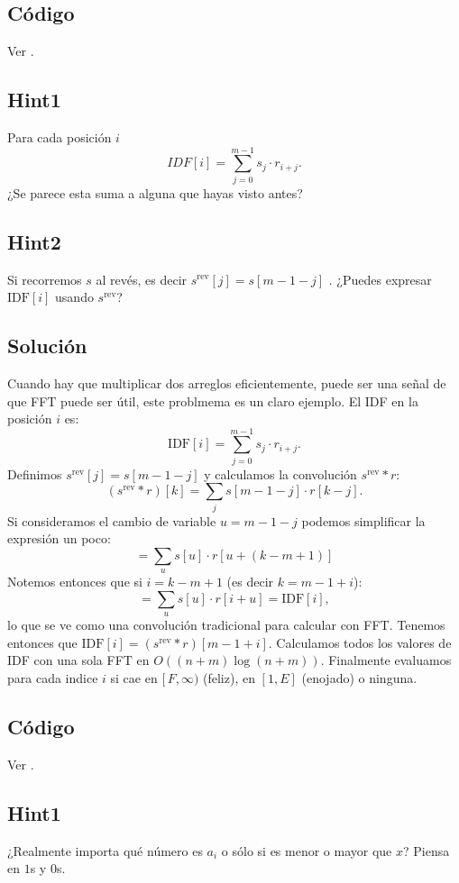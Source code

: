 \subsection*{Código}
Ver .

\subsection*{Hint1}
Para cada posición $i$
\[IDF[i]=\sum_{j=0}^{m-1} s_j \cdot r_{i+j}.\]
¿Se parece esta suma a alguna que hayas visto antes?
\subsection*{Hint2}
Si recorremos $s$ al revés, es decir $s^{\text{rev}}[j] = s[m-1-j]$ . ¿Puedes
expresar $\text{IDF}[i]$ usando $s^{\text{rev}}$?
\subsection*{Solución}
Cuando hay que multiplicar dos arreglos eficientemente, puede ser una señal de que FFT puede ser útil, este problmema es un claro ejemplo.
El IDF en la posición $i$ es:
\[
\text{IDF}[i] = \sum_{j=0}^{m-1} s_j \cdot r_{i+j}.
\]
Definimos $s^{\text{rev}}[j] = s[m-1-j]$ y calculamos la convolución
$s^{\text{rev}} * r$:
\[
(s^{\text{rev}} * r)[k] = \sum_j s[m-1-j] \cdot r[k-j].
\]
Si consideramos el cambio de variable $u = m-1-j$ podemos simplificar la expresión un poco:
\[
= \sum_u s[u] \cdot r[u+(k-m+1)]
\]
Notemos entonces que si $i = k-m+1$ (es decir $k = m-1+i$):
\[
= \sum_u s[u] \cdot r[i+u] = \text{IDF}[i],
\]
lo que se ve como una convolución tradicional para calcular con FFT. Tenemos entonces que $\text{IDF}[i] = (s^{\text{rev}} * r)[m-1+i]$. Calculamos
todos los valores de IDF con una sola FFT en $O((n+m)\log(n+m))$. Finalmente evaluamos para cada indice $i$ si cae en  $[\,F, \infty)$ (feliz), en $[1, E]$ (enojado) o ninguna.
\subsection*{Código}
Ver .

\subsection*{Hint1}
¿Realmente importa qué número es $a_i$ o sólo si es menor o mayor que $x$? Piensa en $1$s y $0$s.
